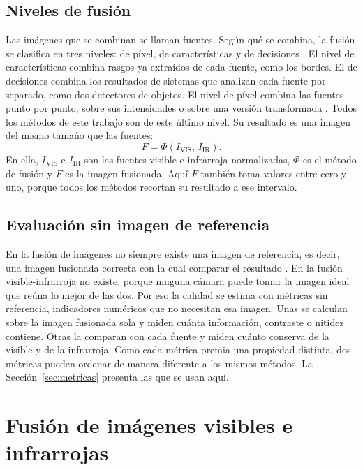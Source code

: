 \subsection{Niveles de fusión}

Las imágenes que se combinan se llaman fuentes. Según qué se combina, la fusión se clasifica en tres
niveles: de píxel, de características y de decisiones \parencite{singh2023}. El nivel de características
combina rasgos ya extraídos de cada fuente, como los bordes. El de decisiones combina los resultados de
sistemas que analizan cada fuente por separado, como dos detectores de objetos. El nivel de píxel
combina las fuentes punto por punto, sobre sus intensidades o sobre una versión transformada
\parencite{li2017}. Todos los métodos de este trabajo son de este último nivel. Su resultado
es una imagen del mismo tamaño que las fuentes:
\begin{equation} F = \Phi\left(I_{\mathrm{VIS}},\, I_{\mathrm{IR}}\right). \label{eq:fusion-pixel} \end{equation}
En ella, $I_{\mathrm{VIS}}$ e $I_{\mathrm{IR}}$ son las fuentes visible e infrarroja normalizadas, $\Phi$
es el método de fusión y $F$ es la imagen fusionada. Aquí $F$ también toma valores entre cero y uno,
porque todos los métodos recortan su resultado a ese intervalo.

\subsection{Evaluación sin imagen de referencia}

En la fusión de imágenes no siempre existe una imagen de referencia, es decir, una imagen fusionada
correcta con la cual comparar el resultado \parencite{singh2023}. En la fusión visible-infrarroja no existe,
porque ninguna cámara puede tomar la imagen ideal que reúna lo mejor de las dos. Por eso la calidad se
estima con métricas sin referencia, indicadores numéricos que no necesitan esa imagen. Unas se calculan
sobre la imagen fusionada sola y miden cuánta información, contraste o nitidez contiene. Otras la
comparan con cada fuente y miden cuánto conserva de la visible y de la infrarroja. Como cada métrica
premia una propiedad distinta, dos métricas pueden ordenar de manera diferente a los mismos métodos. La
Sección~\ref{sec:metricas} presenta las que se usan aquí.

\section{Fusión de imágenes visibles e infrarrojas}
\label{sec:fusion}

